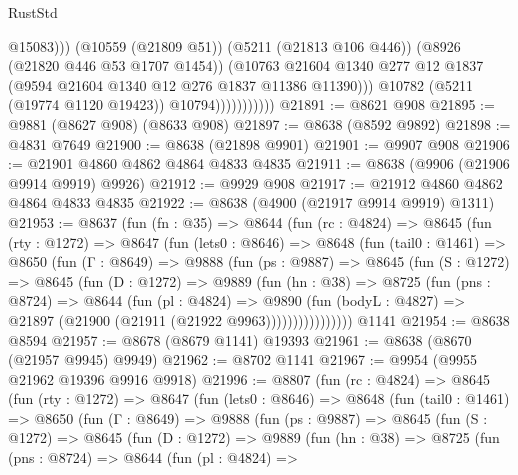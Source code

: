 \begin{lexlean}{RustStd}
\begin{coremodule}
                                  @15083)))
                            (@10559 (@21809 @51))
                            (@5211 (@21813 @106 @446))
                            (@8926 (@21820 @446 @53 @1707 @1454))
                            (@10763
                              @21604
                              @1340
                              @277
                              @12
                              @1837
                              (@9594 @21604 @1340 @12 @276 @1837 @11386 @11390)))
                          @10782
                          (@5211 (@19774 @1120 @19423))
                          @10794)))))))))))
@21891 := @8621 @908
@21895 := @9881 (@8627 @908) (@8633 @908)
@21897 := @8638 (@8592 @9892)
@21898 := @4831 @7649
@21900 := @8638 (@21898 @9901)
@21901 := @9907 @908
@21906 := @21901 @4860 @4862 @4864 @4833 @4835
@21911 := @8638 (@9906 (@21906 @9914 @9919) @9926)
@21912 := @9929 @908
@21917 := @21912 @4860 @4862 @4864 @4833 @4835
@21922 := @8638 (@4900 (@21917 @9914 @9919) @1311)
@21953 := @8637
    (fun (fn : @35) =>
    @8644
      (fun (rc : @4824) =>
      @8645
        (fun (rty : @1272) =>
        @8647
          (fun (lets0 : @8646) =>
          @8648
            (fun (tail0 : @1461) =>
            @8650
              (fun (Γ : @8649) =>
              @9888
                (fun (ps : @9887) =>
                @8645
                  (fun (S : @1272) =>
                  @8645
                    (fun (D : @1272) =>
                    @9889
                      (fun (hn : @38) =>
                      @8725
                        (fun (pns : @8724) =>
                        @8644
                          (fun (pl : @4824) =>
                          @9890
                            (fun (bodyL : @4827) =>
                            @21897 (@21900 (@21911 (@21922 @9963))))))))))))))))
    @1141
@21954 := @8638 @8594
@21957 := @8678 (@8679 @1141) @19393
@21961 := @8638 (@8670 (@21957 @9945) @9949)
@21962 := @8702 @1141
@21967 := @9954 (@9955 @21962 @19396 @9916 @9918)
@21996 := @8807
    (fun (rc : @4824) =>
    @8645
      (fun (rty : @1272) =>
      @8647
        (fun (lets0 : @8646) =>
        @8648
          (fun (tail0 : @1461) =>
          @8650
            (fun (Γ : @8649) =>
            @9888
              (fun (ps : @9887) =>
              @8645
                (fun (S : @1272) =>
                @8645
                  (fun (D : @1272) =>
                  @9889
                    (fun (hn : @38) =>
                    @8725
                      (fun (pns : @8724) =>
                      @8644
                        (fun (pl : @4824) =>

\end{coremodule}
\end{lexlean}
